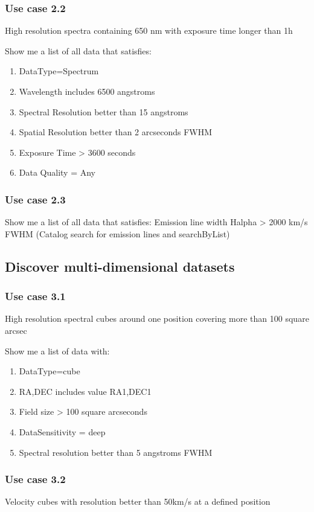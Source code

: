 \documentclass[11pt,a4paper]{ivoa}
\begin{document}
\subsubsection{Use case 2.2}
High resolution spectra containing 650 nm with exposure time longer than 1h

Show me a list of all data that satisfies:

\begin{enumerate}
\item DataType=Spectrum
\item Wavelength includes 6500 angstroms
\item Spectral Resolution better than 15 angstroms
\item Spatial Resolution better than 2 arcseconds FWHM
\item Exposure Time {\textgreater} 3600 seconds
\item Data Quality = Any
\end{enumerate}
\subsubsection{Use case 2.3}
Show me a list of all data that satisfies: Emission line width Halpha {\textgreater} 2000 km/s FWHM (Catalog search for
emission lines and searchByList)

\subsection{Discover multi-dimensional datasets}
\subsubsection{Use case 3.1}
High resolution spectral cubes around one position covering more than 100 square arcsec

Show me a list of data with:

\begin{enumerate}
\item DataType=cube 
\item RA,DEC includes value RA1,DEC1
\item Field size {\textgreater} 100 square arcseconds
\item DataSensitivity = deep
\item Spectral resolution better than 5 angstroms FWHM
\end{enumerate}
\subsubsection{Use case 3.2}
Velocity cubes with resolution better than 50km/s at a defined position  
\end{document}
